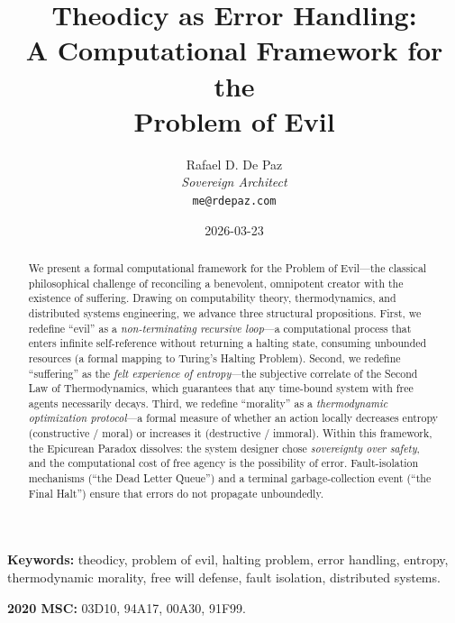 \documentclass[12pt, a4paper]{article}
\theoremstyle{plain}
\theoremstyle{definition}
\begin{document}
\title{\textbf{
  Theodicy as Error Handling: \\
  A Computational Framework for the \\
  Problem of Evil}}
\author{Rafael D. De Paz \\ \textit{Sovereign Architect} \\ \texttt{me@rdepaz.com}}
\date{2026-03-23}
\maketitle

\begin{abstract}
We present a formal computational framework for the Problem of Evil---the
classical philosophical challenge of reconciling a benevolent, omnipotent
creator with the existence of suffering. Drawing on computability theory,
thermodynamics, and distributed systems engineering, we advance three
structural propositions. First, we redefine ``evil'' as a \emph{non-terminating
recursive loop}---a computational process that enters infinite self-reference
without returning a halting state, consuming unbounded resources (a formal
mapping to Turing's Halting Problem). Second, we redefine ``suffering'' as the
\emph{felt experience of entropy}---the subjective correlate of the Second
Law of Thermodynamics, which guarantees that any time-bound system with free
agents necessarily decays. Third, we redefine ``morality'' as a
\emph{thermodynamic optimization protocol}---a formal measure of whether an
action locally decreases entropy (constructive / moral) or increases it
(destructive / immoral). Within this framework, the Epicurean Paradox
dissolves: the system designer chose \emph{sovereignty over safety}, and
the computational cost of free agency is the possibility of error.
Fault-isolation mechanisms (``the Dead Letter Queue'') and a terminal
garbage-collection event (``the Final Halt'') ensure that errors do not
propagate unboundedly.
\end{abstract}

\vspace{1em}
\noindent\textbf{Keywords:} theodicy, problem of evil, halting problem,
error handling, entropy, thermodynamic morality, free will defense,
fault isolation, distributed systems.

\vspace{0.5em}
\noindent\textbf{2020 MSC:} 03D10, 94A17, 00A30, 91F99.

\end{document}
